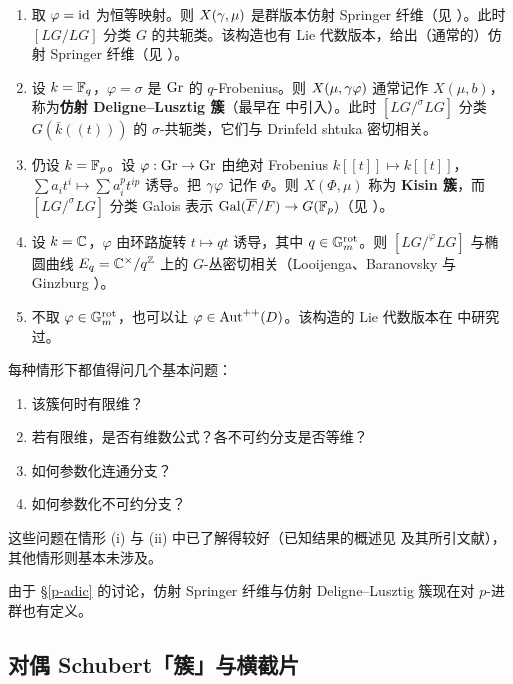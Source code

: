 \begin{enumerate}
\item[(i)] 取 $\varphi={\operatorname{id}}$ 为恒等映射。则 $X({\gamma},\mu)$ 是群版本仿射 Springer 纤维（见 \cite[\S~2.7.3]{Yu}）。此时 $[LG/LG]$ 分类 $G$ 的共轭类。该构造也有 Lie 代数版本，给出（通常的）仿射 Springer 纤维（见 \cite[\S~2.2]{Yu}）。

\item[(ii)] 设 $k={\mathbb F}_q$，$\varphi=\sigma$ 是 ${\operatorname{Gr}}$ 的 $q$-Frobenius。则 $X(\mu,{\gamma}\varphi)$ 通常记作 $X(\mu,b)$，称为\textbf{仿射 Deligne--Lusztig 簇}（最早在 \cite{Ra} 中引入）。此时 $[LG/^{\sigma}LG]$ 分类 $G(\bar{k}((t)))$ 的 $\sigma$-共轭类，它们与 Drinfeld shtuka 密切相关。

\item[(iii)] 仍设 $k={\mathbb F}_p$。设 $\varphi:{\operatorname{Gr}}\to {\operatorname{Gr}}$ 由绝对 Frobenius $k[[t]]\mapsto k[[t]]$，$\sum a_it^i\mapsto \sum a_i^pt^{ip}$ 诱导。把 ${\gamma}\varphi$ 记作 $\Phi$。则 $X(\Phi,\mu)$ 称为 \textbf{Kisin 簇}，而 $[LG/^{\sigma}LG]$ 分类 Galois 表示 ${\operatorname{Gal}}(\overline F/ F)\to G({\mathbb F}_p)$（见 \cite{PR2}）。

\item[(iv)] 设 $k={\mathbb C}$，$\varphi$ 由环路旋转 $t\mapsto qt$ 诱导，其中 $q\in {\mathbb G}_m^{\operatorname{rot}}$。则 $[LG/^{\varphi}LG]$ 与椭圆曲线 $E_q={\mathbb C}^\times/q^{\mathbb Z}$ 上的 $G$-丛密切相关（Looijenga、Baranovsky 与 Ginzburg \cite{BG}）。

\item[(v)] 不取 $\varphi\in {\mathbb G}_m^{\operatorname{rot}}$，也可以让 $\varphi\in {\operatorname{Aut}}^{++}(D)$。该构造的 Lie 代数版本在 \cite{FZ} 中研究过。
\end{enumerate}

每种情形下都值得问几个基本问题：
\begin{enumerate}
\item 该簇何时有限维？
\item 若有限维，是否有维数公式？各不可约分支是否等维？
\item 如何参数化连通分支？
\item 如何参数化不可约分支？
\end{enumerate}

这些问题在情形 (i) 与 (ii) 中已了解得较好（已知结果的概述见 \cite{Gortz, Yu} 及其所引文献），其他情形则基本未涉及。

\begin{rmk}由于 \S\ref{p-adic} 的讨论，仿射 Springer 纤维与仿射 Deligne--Lusztig 簇现在对 $p$-进群也有定义。\end{rmk}

\subsection{对偶 Schubert「簇」与横截片}

